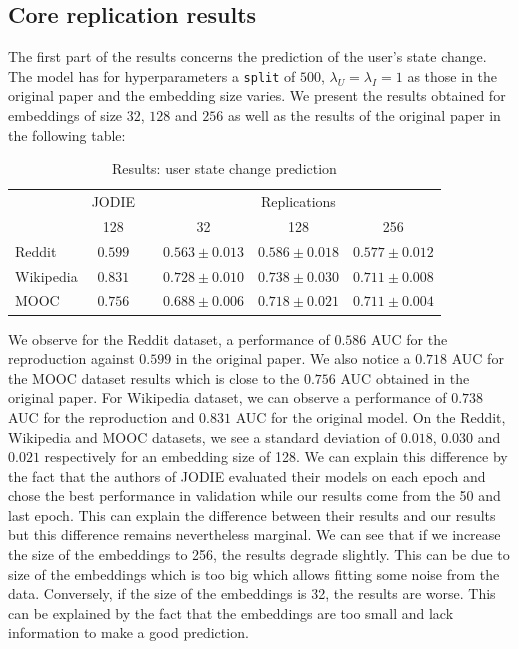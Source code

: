 \subsection*{Core replication results}
The first part of the results concerns the prediction of the user's state change. The model has for hyperparameters a \texttt{split} of $500$, $\lambda_U = \lambda_I = 1$ as those in the original paper and the embedding size varies. We present the results obtained for embeddings of size $32$, $128$ and $256$ as well as the results of the original paper in the following table:

\begin{table}[H]
    \centering
    \begin{tabular}{@{}lcrrrr@{}}
    \toprule
    & JODIE & \phantom{abc} & \multicolumn{3}{c}{Replications} \\
    \cmidrule{2-2} \cmidrule{4-6}
    & 128 && \multicolumn{1}{c}{32} & \multicolumn{1}{c}{128} & \multicolumn{1}{c}{256} \\
    \midrule
    Reddit & $\boldsymbol{0.599}$ && $0.563 \pm 0.013$ & $0.586 \pm 0.018$ & $0.577 \pm 0.012$\\
    Wikipedia &$\boldsymbol{0.831}$ && $0.728 \pm 0.010$ & $0.738 \pm 0.030$ & $0.711 \pm 0.008$\\
    MOOC &$\boldsymbol{0.756}$ && $0.688 \pm 0.006$ & $0.718 \pm 0.021$ & $0.711 \pm 0.004$\\
    \bottomrule
    \end{tabular}
    \caption{Results: user state change prediction}
\end{table}

We observe for the Reddit dataset, a performance of $0.586$ AUC for the reproduction against $0.599$ in the original paper. We also notice a  $0.718$ AUC  for the MOOC dataset results which is close to the $0.756$ AUC obtained in the original paper. For Wikipedia dataset, we can observe a performance of $0.738$ AUC for the reproduction and $0.831$ AUC for the original model. On the Reddit, Wikipedia and MOOC datasets, we see a standard deviation of $0.018$, $0.030$ and $0.021$ respectively for an embedding size of 128. We can explain this difference by the fact that the authors of JODIE evaluated their models on each epoch and chose the best performance in validation while our results come from the 50 and last epoch. This can explain the difference between their results and our results but this difference remains nevertheless marginal.
We can see that if we increase the size of the embeddings to 256, the results degrade slightly. This can be due to size of the embeddings which is too big which allows fitting some noise from the data. Conversely, if the size of the embeddings is 32, the results are worse. This can be explained by the fact that the embeddings are too small and lack information to make a good prediction.\\

